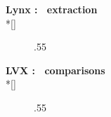      \begin{minipage}[t]{\textwidth}
       {\bf Lynx : \netlist\ extraction}
       \\*[\bigskipamount]
       \forceindent
       \begin{figure}[H]
         \begin{center}
           \leavevmode\epsfxsize.55\textwidth{}
         \end{center}
       \end{figure}
     \end{minipage}
     \begin{minipage}[t]{\textwidth}
       {\bf LVX : \netlist\ comparisons}
       \\*[\bigskipamount]
       \forceindent
       \begin{figure}[H]
         \begin{center}
           \leavevmode\epsfxsize.55\textwidth{}
         \end{center}
       \end{figure}
     \end{minipage}
